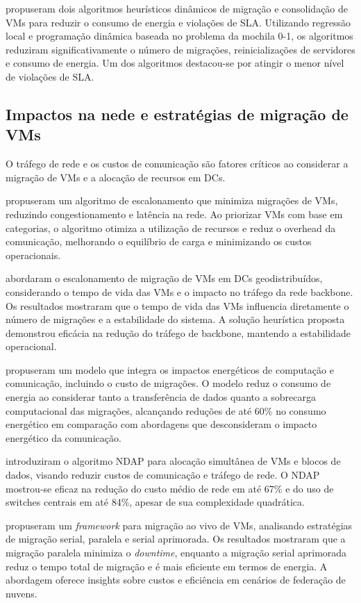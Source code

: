 \documentclass[
	12pt,				%
	oneside,			%
	a4paper,			%
	english,			%
	brazil				%
	]{abntex2ppgsi}
\begin{document}
 propuseram dois algoritmos heurísticos dinâmicos de migração e consolidação de VMs para reduzir o consumo de energia e violações de SLA. Utilizando regressão local e programação dinâmica baseada no problema da mochila 0-1, os algoritmos reduziram significativamente o número de migrações, reinicializações de servidores e consumo de energia. Um dos algoritmos destacou-se por atingir o menor nível de violações de SLA.

\subsection{Impactos na nede e estratégias de migração de VMs}

O tráfego de rede e os custos de comunicação são fatores críticos ao considerar a migração de VMs e a alocação de recursos em DCs.

 propuseram um algoritmo de escalonamento que minimiza migrações de VMs, reduzindo congestionamento e latência na rede. Ao priorizar VMs com base em categorias, o algoritmo otimiza a utilização de recursos e reduz o overhead da comunicação, melhorando o equilíbrio de carga e minimizando os custos operacionais.

 abordaram o escalonamento de migração de VMs em DCs geodistribuídos, considerando o tempo de vida das VMs e o impacto no tráfego da rede backbone. Os resultados mostraram que o tempo de vida das VMs influencia diretamente o número de migrações e a estabilidade do sistema. A solução heurística proposta demonstrou eficácia na redução do tráfego de backbone, mantendo a estabilidade operacional.

 propuseram um modelo que integra os impactos energéticos de computação e comunicação, incluindo o custo de migrações. O modelo reduz o consumo de energia ao considerar tanto a transferência de dados quanto a sobrecarga computacional das migrações, alcançando reduções de até 60\% no consumo energético em comparação com abordagens que desconsideram o impacto energético da comunicação.

 introduziram o algoritmo NDAP para alocação simultânea de VMs e blocos de dados, visando reduzir custos de comunicação e tráfego de rede. O NDAP mostrou-se eficaz na redução do custo médio de rede em até 67\% e do uso de switches centrais em até 84\%, apesar de sua complexidade quadrática.

 propuseram um \textit{framework} para migração ao vivo de VMs, analisando estratégias de migração serial, paralela e serial aprimorada. Os resultados mostraram que a migração paralela minimiza o \textit{downtime}, enquanto a migração serial aprimorada reduz o tempo total de migração e é mais eficiente em termos de energia. A abordagem oferece insights sobre custos e eficiência em cenários de federação de nuvens.
\end{document}
